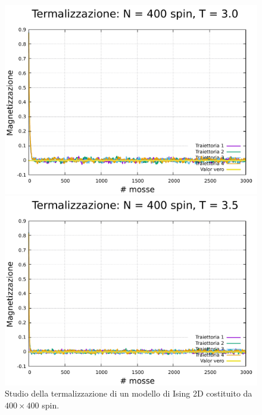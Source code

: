 \begin{figure}[htbp]
    \begin{minipage}{0.45\textwidth}  
      \centering
      \includegraphics[page=1, width=\textwidth]{Immagini/simIsing2D/metro/term/term_400_3.0.pdf}
      \caption{$T\,=\,3.0$}
    \end{minipage}\hfill
    \begin{minipage}{0.45\textwidth}  
      \centering
      \includegraphics[page=1, width=\textwidth]{Immagini/simIsing2D/metro/term/term_400_3.5.pdf}
      \caption{$T\,=\,3.5$}
    \end{minipage}
    \caption{Studio della termalizzazione di un modello di Ising 2D costituito da $400 \times 400$ spin.}
\end{figure}

